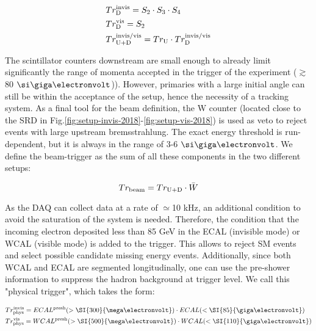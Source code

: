\begin{equation}
\label{eq:trigger-downstream}
\begin{split}      
& Tr^{\rm{invis}}_{\rm{D}} = S_2 \cdot S_3 \cdot S_4 \\
& Tr^{\rm{vis}}_{\rm{D}} = S_2 \\
& Tr^{\rm{invis/vis}}_{\rm{U}+\rm{D}} = Tr_{\rm{U}} \cdot Tr^{\rm{invis/vis}}_{\rm{D}}
\end{split}
\end{equation}

The scintillator counters downstream are small enough to already limit significantly the range of momenta accepted in the trigger of the experiment ($\gtrsim$ 80 $\gev$)). However, primaries with a large initial angle can still be within the acceptance of the setup, hence the
necessity of a tracking system. As a final tool for the beam definition, the W counter (located close to the SRD in Fig.\ref{fig:setup-invis-2018}-\ref{fig:setup-vis-2018}) is used as veto to reject events with large upstream bremsstrahlung. The exact energy threshold is run-dependent, but it is always in the range of 3-6 $\gev$. We define the beam-trigger as the sum of all these components in the two different setups:

\begin{equation}
\label{eq:trigger-beam}
Tr_{\rm{beam}} = Tr_{\rm{U}+\rm{D}} \cdot \bar{W}
\end{equation}

As the DAQ can collect data at a rate of $\simeq$10 \si{kHz}, an additional condition to avoid the saturation of the system is needed. Therefore, the condition that the incoming electron deposited less than 85 GeV in the ECAL (invisible mode) or WCAL (visible mode) is added to the trigger. This allows to reject SM events and select possible candidate missing energy events. Additionally, since both WCAL and ECAL are segmented longitudinally, one can use the pre-shower information to suppress the hadron background at trigger level. We call this "physical trigger", which takes the form:

\begin{equation}
\label{eq:trigger-phys}
\begin{split}
& Tr^{\rm{invis}}_{\rm{phys}} = ECAL^{\rm{presh}}(> \SI{300}{\mega\electronvolt}) \cdot ECAL(<\SI{85}{\giga\electronvolt})\\
& Tr^{\rm{vis}}_{\rm{phys}} = WCAL^{\rm{presh}}(>\SI{500}{\mega\electronvolt}) \cdot WCAL(<\SI{110}{\giga\electronvolt})
\end{split}
\end{equation}

